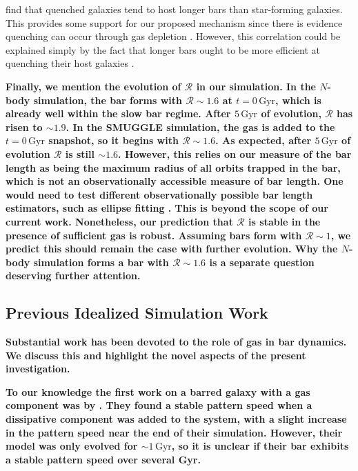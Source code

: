 \documentclass[twocolumn,linenumbers,trackchanges]{aastex631}
\newcommand{\Rot}{\ensuremath{\mathcal{R}}}
\begin{document}
\citet{2020MNRAS.495.4158F} find that quenched galaxies tend to host longer bars
than star-forming galaxies. This provides some support for our proposed
mechanism since there is evidence quenching can occur through gas depletion
\citep[e.g.][]{2021Natur.597..485W}. However, this correlation could be
explained simply by the fact that longer bars ought to be more efficient at
quenching their host galaxies \citep[e.g][]{2015AA...580A.116G}.

{\bf Finally, we mention the evolution of \Rot{} in our simulation. In the
$N$-body simulation, the bar forms with $\Rot\sim1.6$ at $t=0\,\textrm{Gyr}$,
which is already well within the slow bar regime. After $5\,\textrm{Gyr}$ of
evolution, \Rot{} has risen to $\sim1.9$. In the SMUGGLE simulation, the gas is
added to the $t=0\,\textrm{Gyr}$ snapshot, so it begins with $\Rot{}\sim1.6$. As
expected, after $5\,\textrm{Gyr}$ of evolution \Rot{} is still $\sim1.6$.
However, this relies on our measure of the bar length as being the maximum
radius of all orbits trapped in the bar, which is not an observationally
accessible measure of bar length. One would need to test different
observationally possible bar length estimators, such as ellipse fitting
\citep{1990MNRAS.245..130A, 1999AAS..140....1M, 2002MNRAS.330...35A,
2006AA...452...97M, 2009AA...495..491A, 2015AA...576A.102A}. This is beyond the
scope of our current work. Nonetheless, our prediction that \Rot{} is stable in
the presence of sufficient gas is robust. Assuming bars form with $\Rot\sim1$,
we predict this should remain the case with further evolution. Why the $N$-body
simulation forms a bar with $\Rot\sim1.6$ is a separate question deserving
further attention.}

\subsection{Previous Idealized Simulation Work}
{\bf Substantial work has been devoted to the role of gas in bar dynamics. We
discuss this and highlight the novel aspects of the present investigation.}

{\bf To our knowledge the first work on a barred galaxy with a gas component was
by \citet{1993AA...268...65F}. They found a stable pattern speed when a
dissipative component was added to the system, with a slight increase in the
pattern speed near the end of their simulation. However, their model was only
evolved for $\sim1\,\textrm{Gyr}$, so it is unclear if their bar exhibits a
stable pattern speed over several Gyr.}
\end{document}
